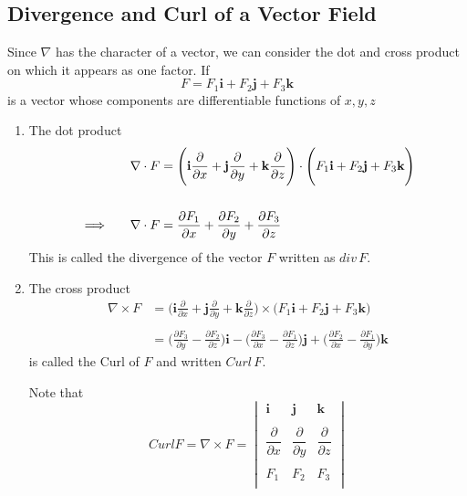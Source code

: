 \documentclass[11pt,a4paper]{article}
\theoremstyle{definition}
\begin{document}
{\color[wave]{485}\subsection{Divergence and Curl of a Vector Field}}
Since $\nabla$ has the character of a vector, we can consider the dot and cross product on which it appears as one factor. If $$F = F_1 \textbf{i} + F_2 \textbf{j} + F_3\textbf{k}$$ is a vector whose components are differentiable functions of $x, y, z$

\begin{enumerate}
\item The dot product 
\begin{align*}
\nabla\cdot F & = \Bigg(\textbf{i}\frac{\partial}{\partial x} + \textbf{j}\frac{\partial}{\partial y} + \textbf{k}\frac{\partial}{\partial z}\Bigg)\cdot\Bigg(F_1\textbf{i} + F_2\textbf{j} + F_3\textbf{k}\Bigg)\\\\
\implies \hspace{0.5cm}\nabla\cdot F & = \frac{\partial F_1}{\partial x} + \frac{\partial F_2}{\partial y} + \frac{\partial F_3}{\partial z}
\end{align*}
This is called the divergence of the vector $F$ written as $div\, F$.

\item The cross product
\begin{align*}
\nabla \times F & = \Bigg(\textbf{i} \frac{\partial}{\partial x} + \textbf{j} \frac{\partial}{\partial y} + \textbf{k} \frac{\partial}{\partial z}\Bigg) \times \Big( F_1\textbf{i} + F_2\textbf{j} + F_3\textbf{k}\Big)\\\\
& = \Bigg( \frac{\partial F_3}{\partial y}-\frac{\partial F_2}{\partial z}\Bigg)\textbf{i} - \Bigg(\frac{\partial F_3}{\partial x}-\frac{\partial F_1}{\partial z}\Bigg) \textbf{j} + \Bigg(\frac{\partial F_2 }{\partial x}-\frac{\partial F_1}{\partial y}\Bigg) \textbf{k}
\end{align*}
is called the Curl of $F$ and written $Curl\, F$.

Note that
$$Curl F = \nabla \times F = 
\begin{vmatrix}
\textbf{i} & \textbf{j} & \textbf{k}\\\\
\dfrac{\partial}{\partial x} & \dfrac{\partial}{\partial y} & \dfrac{\partial }{\partial z}\\\\
F_1 & F_2 & F_3\\
\end{vmatrix}
$$


\end{enumerate}
\end{document}
